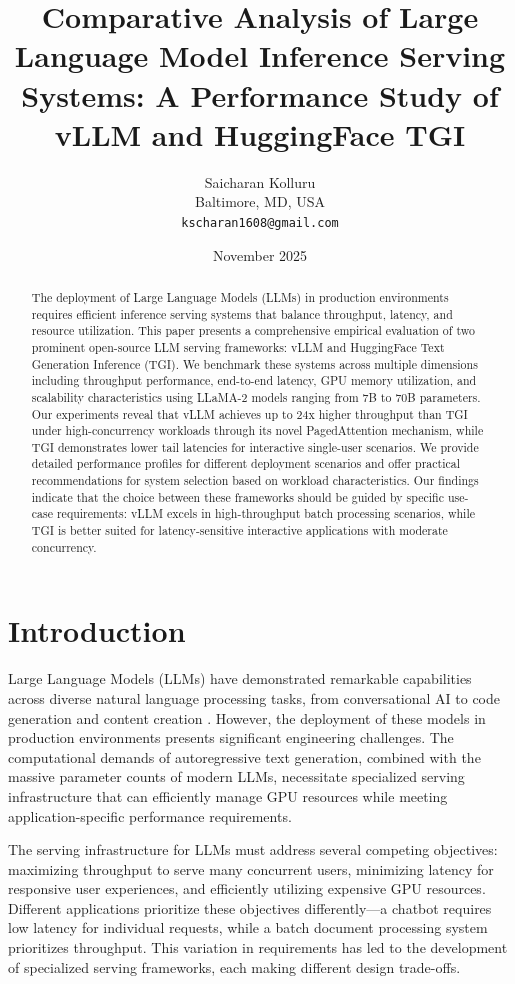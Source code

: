 \documentclass{article}
\title{Comparative Analysis of Large Language Model Inference Serving Systems: A Performance Study of vLLM and HuggingFace TGI}
\author{
  Saicharan Kolluru \\
  Baltimore, MD, USA \\
  \texttt{kscharan1608@gmail.com}
}
\date{November 2025}
\begin{document}
\maketitle

\begin{abstract}
The deployment of Large Language Models (LLMs) in production environments requires efficient inference serving systems that balance throughput, latency, and resource utilization. This paper presents a comprehensive empirical evaluation of two prominent open-source LLM serving frameworks: vLLM and HuggingFace Text Generation Inference (TGI). We benchmark these systems across multiple dimensions including throughput performance, end-to-end latency, GPU memory utilization, and scalability characteristics using LLaMA-2 models ranging from 7B to 70B parameters. Our experiments reveal that vLLM achieves up to 24x higher throughput than TGI under high-concurrency workloads through its novel PagedAttention mechanism, while TGI demonstrates lower tail latencies for interactive single-user scenarios. We provide detailed performance profiles for different deployment scenarios and offer practical recommendations for system selection based on workload characteristics. Our findings indicate that the choice between these frameworks should be guided by specific use-case requirements: vLLM excels in high-throughput batch processing scenarios, while TGI is better suited for latency-sensitive interactive applications with moderate concurrency.
\end{abstract}

\section{Introduction}

Large Language Models (LLMs) have demonstrated remarkable capabilities across diverse natural language processing tasks, from conversational AI to code generation and content creation \cite{brown2020language, chowdhery2022palm, touvron2023llama}. However, the deployment of these models in production environments presents significant engineering challenges. The computational demands of autoregressive text generation, combined with the massive parameter counts of modern LLMs, necessitate specialized serving infrastructure that can efficiently manage GPU resources while meeting application-specific performance requirements.

The serving infrastructure for LLMs must address several competing objectives: maximizing throughput to serve many concurrent users, minimizing latency for responsive user experiences, and efficiently utilizing expensive GPU resources. Different applications prioritize these objectives differently—a chatbot requires low latency for individual requests, while a batch document processing system prioritizes throughput. This variation in requirements has led to the development of specialized serving frameworks, each making different design trade-offs.
\end{document}

